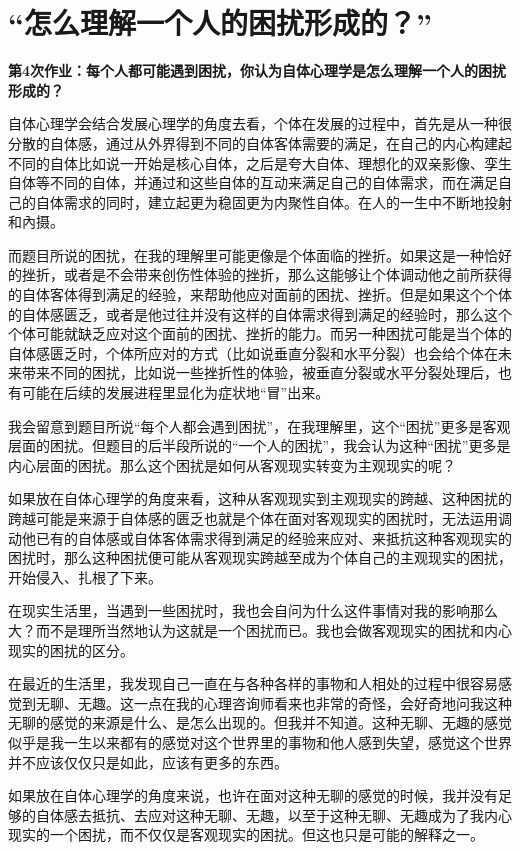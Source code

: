 \chapter{“怎么理解一个人的困扰形成的？”}





\textbf{第4次作业：每个人都可能遇到困扰，你认为自体心理学是怎么理解一个人的困扰形成的？}

自体心理学会结合发展心理学的角度去看，个体在发展的过程中，首先是从一种很分散的自体感，通过从外界得到不同的自体客体需要的满足，在自己的内心构建起不同的自体\pozhehao{}比如说一开始是核心自体，之后是夸大自体、理想化的双亲影像、孪生自体等不同的自体，并通过和这些自体的互动来满足自己的自体需求，而在满足自己的自体需求的同时，建立起更为稳固更为内聚性自体。在人的一生中不断地投射和內摄。

而题目所说的困扰，在我的理解里可能更像是个体面临的挫折。如果这是一种恰好的挫折，或者是不会带来创伤性体验的挫折，那么这能够让个体调动他之前所获得的自体客体得到满足的经验，来帮助他应对面前的困扰、挫折。但是如果这个个体的自体感匮乏，或者是他过往并没有这样的自体需求得到满足的经验时，那么这个个体可能就缺乏应对这个面前的困扰、挫折的能力。而另一种困扰可能是当个体的自体感匮乏时，个体所应对的方式（比如说垂直分裂和水平分裂）也会给个体在未来带来不同的困扰，比如说一些挫折性的体验，被垂直分裂或水平分裂处理后，也有可能在后续的发展进程里显化为症状地“冒”出来。

我会留意到题目所说“每个人都会遇到困扰”，在我理解里，这个“困扰”更多是客观层面的困扰。但题目的后半段所说的“一个人的困扰”，我会认为这种“困扰”更多是内心层面的困扰。那么这个困扰是如何从客观现实转变为主观现实的呢？

如果放在自体心理学的角度来看，这种从客观现实到主观现实的跨越、这种困扰的跨越可能是来源于自体感的匮乏\pozhehao{}也就是个体在面对客观现实的困扰时，无法运用调动他已有的自体感或自体客体需求得到满足的经验来应对、来抵抗这种客观现实的困扰时，那么这种困扰便可能从客观现实跨越至成为个体自己的主观现实的困扰，开始侵入、扎根了下来。

在现实生活里，当遇到一些困扰时，我也会自问为什么这件事情对我的影响那么大？而不是理所当然地认为这就是一个困扰而已。我也会做客观现实的困扰和内心现实的困扰的区分。

在最近的生活里，我发现自己一直在与各种各样的事物和人相处的过程中很容易感觉到无聊、无趣。这一点在我的心理咨询师看来也非常的奇怪，会好奇地问我这种无聊的感觉的来源是什么、是怎么出现的。但我并不知道。这种无聊、无趣的感觉似乎是我一生以来都有的感觉\pozhehao{}对这个世界里的事物和他人感到失望，感觉这个世界并不应该仅仅只是如此，应该有更多的东西。

如果放在自体心理学的角度来说，也许在面对这种无聊的感觉的时候，我并没有足够的自体感去抵抗、去应对这种无聊、无趣，以至于这种无聊、无趣成为了我内心现实的一个困扰，而不仅仅是客观现实的困扰。但这也只是可能的解释之一。

